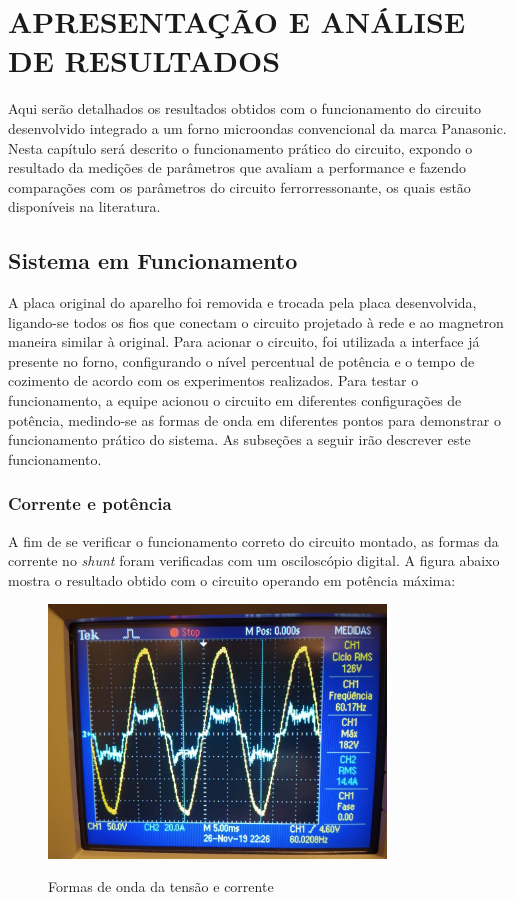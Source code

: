 
\chapter{APRESENTAÇÃO E ANÁLISE DE RESULTADOS}

Aqui serão detalhados os resultados obtidos com o funcionamento do circuito desenvolvido integrado a um forno microondas convencional da marca Panasonic. Nesta capítulo será descrito o funcionamento prático do circuito, expondo o resultado da medições de parâmetros que avaliam a performance e fazendo comparações com os parâmetros do circuito ferrorressonante, os quais estão disponíveis na literatura. 


\section{Sistema em Funcionamento}
A placa original do aparelho foi removida e trocada pela placa desenvolvida, ligando-se todos os fios que conectam o circuito projetado à rede e ao magnetron maneira similar à original. Para acionar o circuito, foi utilizada a interface já presente no forno, configurando o nível percentual de potência e o tempo de cozimento de acordo com os experimentos realizados. Para testar o funcionamento, a equipe acionou o circuito em diferentes configurações de potência, medindo-se as formas de onda em diferentes pontos para demonstrar o funcionamento prático do sistema. As subseções a seguir irão descrever este funcionamento.

\subsection{Corrente e potência}
A fim de se verificar o funcionamento correto do circuito montado, as formas da corrente no \textit{shunt} foram verificadas com um osciloscópio digital. A figura abaixo mostra o resultado obtido com o circuito operando em potência máxima:

\begin{figure}[H]
    \centering
    \caption{Formas de onda da tensão e corrente}
    \includegraphics[width=0.8\textwidth]{./dados/figuras/onda_corrente}
    \label{fig:figura-onda_corrente}
\end{figure}


